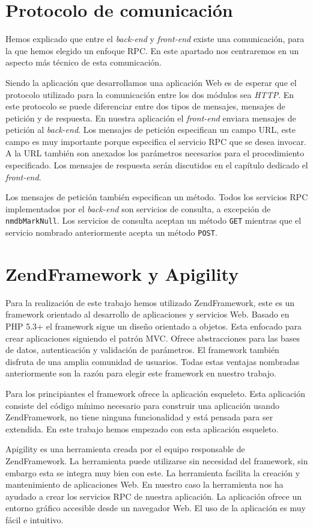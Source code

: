 \section{Protocolo de comunicación}
	Hemos explicado que entre el \emph{back-end} y \emph{front-end} existe una comunicación, para la que hemos elegido un enfoque RPC. En este
	apartado nos centraremos en un aspecto más técnico de esta comunicación. 
	\par
	Siendo la aplicación que desarrollamos una aplicación Web es de esperar que el protocolo utilizado para la comunicación entre los dos módulos
	sea \emph{HTTP}. En este protocolo se puede diferenciar entre dos tipos de mensajes, mensajes de petición y de respuesta. En nuestra
	aplicación el \emph{front-end} enviara mensajes de petición al \emph{back-end}. Los mensajes de petición especifican un campo URL, este campo
	es muy importante porque especifica el servicio RPC que se desea invocar. A la URL también son anexados los parámetros necesarios para el
	procedimiento especificado. Los mensajes de respuesta serán discutidos en el capítulo dedicado el \emph{front-end}.
	\par
	Los mensajes de petición también especifican un método. Todos los servicios RPC implementados por el \emph{back-end} son servicios de
	consulta, a excepción de \texttt{nmdbMarkNull}. Los servicios de consulta aceptan un método \texttt{GET} mientras que el servicio nombrado
	anteriormente acepta un método \texttt{POST}.
\section{ZendFramework y Apigility}
	Para la realización de este trabajo hemos utilizado ZendFramework, este es un framework orientado al desarrollo de aplicaciones y servicios
	Web. Basado en PHP 5.3+ el framework sigue un diseño orientado a objetos. Esta enfocado para crear aplicaciones siguiendo el patrón MVC.
	Ofrece abstracciones para las bases de datos, autenticación y validación de parámetros. El framework también disfruta de una amplia comunidad
	de usuarios. Todas estas ventajas nombradas anteriormente son la razón para elegir este framework en nuestro trabajo.
	\par
	Para  los principiantes el framework ofrece la aplicación esqueleto. Esta aplicación consiste del código mínimo necesario para construir una
	aplicación usando ZendFramework, no tiene ninguna funcionalidad y está pensada para ser extendida. En este trabajo hemos empezado con esta
	aplicación esqueleto.
  	\par
	Apigility es una herramienta creada por el equipo responsable de ZendFramework. La herramienta puede utilizarse sin necesidad del framework,
	sin embargo esta se integra muy bien con este. La herramienta facilita la creación y mantenimiento de aplicaciones Web. En nuestro caso la
	herramienta nos ha ayudado a crear los servicios RPC de nuestra aplicación. La aplicación ofrece un entorno gráfico accesible desde un
	navegador Web. El uso de la aplicación es muy fácil e intuitivo.
